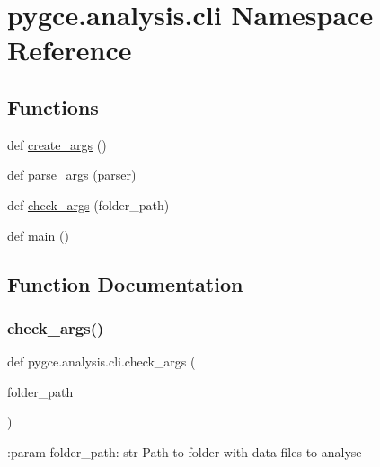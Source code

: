 \hypertarget{namespacepygce_1_1analysis_1_1cli}{}\section{pygce.\+analysis.\+cli Namespace Reference}
\label{namespacepygce_1_1analysis_1_1cli}
\subsection*{Functions}
\begin{DoxyCompactItemize}
\item 
def \hyperlink{namespacepygce_1_1analysis_1_1cli_a419c1db8bd8fc26d5b81a3ca27fe79d4}{create\+\_\+args} ()
\item 
def \hyperlink{namespacepygce_1_1analysis_1_1cli_ac516ecec64d1d3b73eef12d5114ae9c5}{parse\+\_\+args} (parser)
\item 
def \hyperlink{namespacepygce_1_1analysis_1_1cli_aaef37c4489c0f8e69ef918878523b920}{check\+\_\+args} (folder\+\_\+path)
\item 
def \hyperlink{namespacepygce_1_1analysis_1_1cli_a172ae5d6f63e3600d4b184c6e23cd375}{main} ()
\end{DoxyCompactItemize}


\subsection{Function Documentation}
\mbox{\label{namespacepygce_1_1analysis_1_1cli_aaef37c4489c0f8e69ef918878523b920}} 
\subsubsection{\texorpdfstring{check\+\_\+args()}{check\_args()}}
{\footnotesize\ttfamily def pygce.\+analysis.\+cli.\+check\+\_\+args (\begin{DoxyParamCaption}\item[{}]{folder\+\_\+path }\end{DoxyParamCaption})}

\begin{DoxyVerb}:param folder_path: str
    Path to folder with data files to analyse
\end{DoxyVerb}
 

